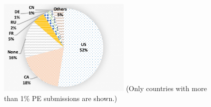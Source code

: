 \begin{figure}[t!]
\begin{center}
\includegraphics[width=2.5in]{figure/countryPie}
{\footnotesize{(Only countries with more than 1\% PE submissions are shown.)}}
\end{center}
\end{figure}